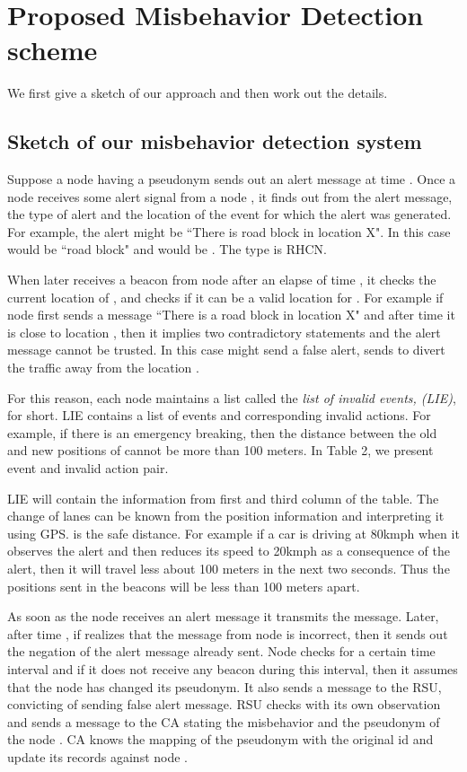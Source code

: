 \documentclass[conference]{IEEEtran}[10pt]
\begin{document}
\section{Proposed Misbehavior Detection scheme}
\label{sec:MDS}
We first give a sketch of our approach and then work out the details. 

\subsection{Sketch of our misbehavior detection system}
Suppose a node  having a pseudonym  sends out an alert message  at time . 
Once a node  receives some alert signal from a node , it finds out from the alert message,  
the type of alert and the location of the event  for which the alert was generated. 
For example, the alert might be ``There is road block in location X". 
In this case  would be ``road block" and  would be . 
The type  is RHCN. 

When  later receives a beacon from node  after an elapse of time , it checks the current location of , 
and checks if it can be a valid location for . 
For example if node  first sends a message ``There is a road block in location X" and after time  it is close to location , 
then it implies two contradictory statements and the alert message cannot be trusted. 
In this case   might send a false alert,  sends to divert the traffic away from the location . 

For this reason, each node maintains a list called the \emph{list of invalid events, (LIE)}, for short. 
LIE contains a list of events and corresponding invalid actions. 
For example, if there is an emergency breaking, then the distance between the old and new positions of  cannot be more than 100 meters. 
In Table 2, we present event and invalid action pair. 

LIE will contain the information from first and third column of the table. 
The change of lanes can be known from the position information and interpreting it using GPS. 
 is the safe distance.  For example if a car is driving at 80kmph when it observes the alert and 
then reduces its speed to 20kmph as a consequence of the alert, then it will travel less about 100 meters in the next two seconds. 
Thus the positions sent in the beacons will be less than 100 meters apart. 

As soon as the node  receives an alert message it transmits the message. 
Later, after time , if  realizes that the message from node  is incorrect, then it sends out the negation of the alert message 
already sent. 
Node  checks for a certain time interval  and if it does not receive any beacon during this interval,
then it assumes that the node  has changed its pseudonym. 
It also sends a message to the RSU, convicting  of sending false alert message. 
RSU checks with its own observation and sends a message to the CA stating the misbehavior and the pseudonym of the node . 
CA knows the mapping of the pseudonym with the original id and update its records against node . 
\end{document}
